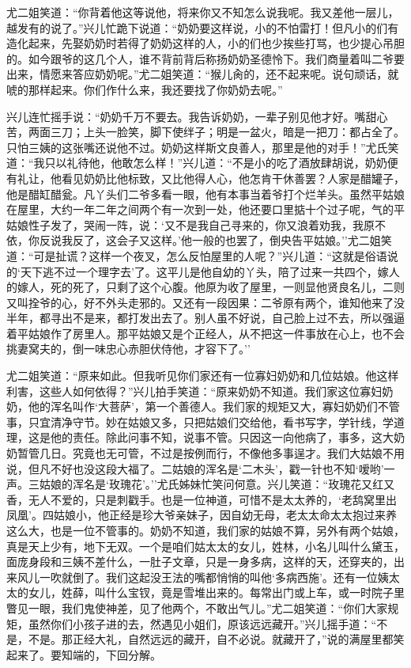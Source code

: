 尤二姐笑道：``你背着他这等说他，将来你又不知怎么说我呢。我又差他一层儿，越发有的说了。''兴儿忙跪下说道：``奶奶要这样说，小的不怕雷打！但凡小的们有造化起来，先娶奶奶时若得了奶奶这样的人，小的们也少挨些打骂，也少提心吊胆的。如今跟爷的这几个人，谁不背前背后称扬奶奶圣德怜下。我们商量着叫二爷要出来，情愿来答应奶奶呢。''尤二姐笑道：``猴儿肏的，还不起来呢。说句顽话，就唬的那样起来。你们作什么来，我还要找了你奶奶去呢。''

兴儿连忙摇手说：``奶奶千万不要去。我告诉奶奶，一辈子别见他才好。嘴甜心苦，两面三刀；上头一脸笑，脚下使绊子；明是一盆火，暗是一把刀：都占全了。只怕三姨的这张嘴还说他不过。奶奶这样斯文良善人，那里是他的对手！''尤氏笑道：``我只以礼待他，他敢怎么样！''兴儿道：``不是小的吃了酒放肆胡说，奶奶便有礼让，他看见奶奶比他标致，又比他得人心，他怎肯干休善罢？人家是醋罐子，他是醋缸醋瓮。凡丫头们二爷多看一眼，他有本事当着爷打个烂羊头。虽然平姑娘在屋里，大约一年二年之间两个有一次到一处，他还要口里掂十个过子呢，气的平姑娘性子发了，哭闹一阵，说：`又不是我自己寻来的，你又浪着劝我，我原不依，你反说我反了，这会子又这样。'他一般的也罢了，倒央告平姑娘。''尤二姐笑道：``可是扯谎？这样一个夜叉，怎么反怕屋里的人呢？''兴儿道：``这就是俗语说的`天下逃不过一个理字去'了。这平儿是他自幼的丫头，陪了过来一共四个，嫁人的嫁人，死的死了，只剩了这个心腹。他原为收了屋里，一则显他贤良名儿，二则又叫拴爷的心，好不外头走邪的。又还有一段因果：二爷原有两个，谁知他来了没半年，都寻出不是来，都打发出去了。别人虽不好说，自己脸上过不去，所以强逼着平姑娘作了房里人。那平姑娘又是个正经人，从不把这一件事放在心上，也不会挑妻窝夫的，倒一味忠心赤胆伏侍他，才容下了。''

尤二姐笑道：``原来如此。但我听见你们家还有一位寡妇奶奶和几位姑娘。他这样利害，这些人如何依得？''兴儿拍手笑道：``原来奶奶不知道。我们家这位寡妇奶奶，他的浑名叫作`大菩萨'，第一个善德人。我们家的规矩又大，寡妇奶奶们不管事，只宜清净守节。妙在姑娘又多，只把姑娘们交给他，看书写字，学针线，学道理，这是他的责任。除此问事不知，说事不管。只因这一向他病了，事多，这大奶奶暂管几日。究竟也无可管，不过是按例而行，不像他多事逞才。我们大姑娘不用说，但凡不好也没这段大福了。二姑娘的浑名是`二木头'，戳一针也不知`嗳哟'一声。三姑娘的浑名是`玫瑰花'。''尤氏姊妹忙笑问何意。兴儿笑道：``玫瑰花又红又香，无人不爱的，只是刺戳手。也是一位神道，可惜不是太太养的，`老鸹窝里出凤凰'。四姑娘小，他正经是珍大爷亲妹子，因自幼无母，老太太命太太抱过来养这么大，也是一位不管事的。奶奶不知道，我们家的姑娘不算，另外有两个姑娘，真是天上少有，地下无双。一个是咱们姑太太的女儿，姓林，小名儿叫什么黛玉，面庞身段和三姨不差什么，一肚子文章，只是一身多病，这样的天，还穿夹的，出来风儿一吹就倒了。我们这起没王法的嘴都悄悄的叫他`多病西施'。还有一位姨太太的女儿，姓薛，叫什么宝钗，竟是雪堆出来的。每常出门或上车，或一时院子里瞥见一眼，我们鬼使神差，见了他两个，不敢出气儿。''尤二姐笑道：``你们大家规矩，虽然你们小孩子进的去，然遇见小姐们，原该远远藏开。''兴儿摇手道：``不是，不是。那正经大礼，自然远远的藏开，自不必说。就藏开了，''说的满屋里都笑起来了。要知端的，下回分解。


